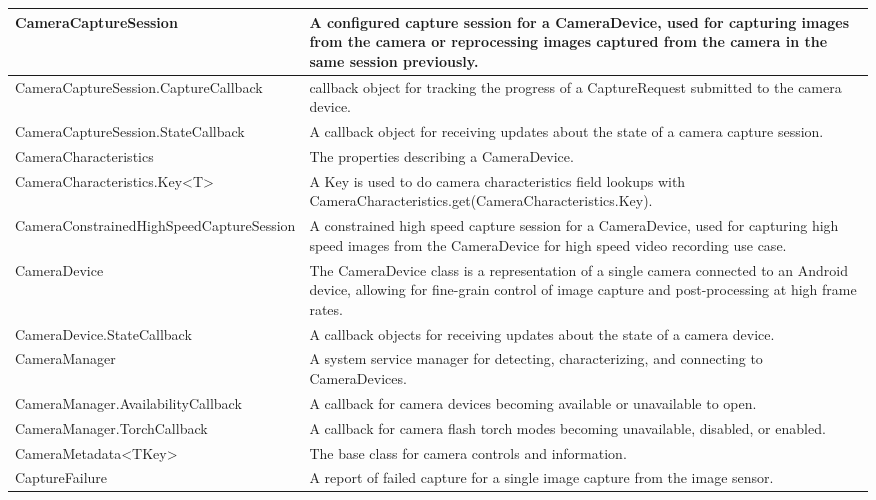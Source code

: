 \begin{table}[h]

	\begin{tabularx}{\textwidth}{|l|X|}
	\hline
	
{CameraCaptureSession} & {A configured capture session for a CameraDevice, used for capturing images from the camera or reprocessing images captured from the camera in the same session previously.}\\ \hline
{CameraCaptureSession.CaptureCallback} & {callback object for tracking the progress of a CaptureRequest submitted to the camera device.}\\ \hline
{CameraCaptureSession.StateCallback} & {A callback object for receiving updates about the state of a camera capture session.}\\ \hline
{CameraCharacteristics} & {The properties describing a CameraDevice.}\\ \hline	
{CameraCharacteristics.Key\textless T\textgreater} & {A Key is used to do camera characteristics field lookups with CameraCharacteristics.get(CameraCharacteristics.Key).}\\ \hline	
{CameraConstrainedHighSpeedCaptureSession} & {A constrained high speed capture session for a CameraDevice, used for capturing high speed images from the CameraDevice for high speed video recording use case.}\\ \hline
{CameraDevice} & {The CameraDevice class is a representation of a single camera connected to an Android device, allowing for fine-grain control of image capture and post-processing at high frame rates.}\\ \hline
{CameraDevice.StateCallback} & {A callback objects for receiving updates about the state of a camera device.}\\ \hline
{CameraManager} & {A system service manager for detecting, characterizing, and connecting to CameraDevices.}\\ \hline
{CameraManager.AvailabilityCallback} & {A callback for camera devices becoming available or unavailable to open.}\\ \hline
{CameraManager.TorchCallback} & {A callback for camera flash torch modes becoming unavailable, disabled, or enabled.}\\ \hline
{CameraMetadata\textless TKey\textgreater} & {The base class for camera controls and information.}\\ \hline
{CaptureFailure} & {A report of failed capture for a single image capture from the image sensor.}\\ \hline

\end{tabularx}
\end{table}
